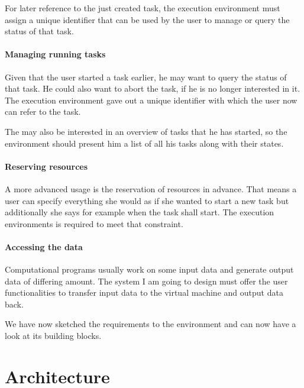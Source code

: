 For later  reference to the  just created task, the  execution environment
must assign a unique identifier that can  be used by the user to manage or
query the status of that task.

\paragraph{Managing running tasks}

Given  that the user  started a  task earlier,  he may  want to  query the
status of  that task. He could  also want to abort  the task, if  he is no
longer  interested in  it. The  execution  environment gave  out a  unique
identifier with which the user now can refer to the task.

The may also be interested in an overview of tasks that he has started, so
the environment  should present  him a  list of all  his tasks  along with
their states.

\paragraph{Reserving resources}

A more  advanced usage  is the reservation  of resources in  advance. That
means a user can specify everything she  would as if she wanted to start a
new task but additionally she says  for example when the task shall start. 
The execution environments is required to meet that constraint.

\paragraph{Accessing the data}

Computational programs usually work on some input data and generate output
data of differing  amount. The system I am going to  design must offer the
user functionalities  to transfer  input data to  the virtual  machine and
output data back.

\bigskip

We have now sketched the requirements  to the environment and can now have
a look at its building blocks.

\section{Architecture}
\label{sec:architecture}

